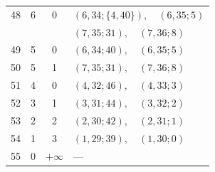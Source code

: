 \documentclass[12pt]{amsart}
\theoremstyle{definition}
\numberwithin{equation}{section}
\begin{document}
\begin{table}[!htbp]
\begin{minipage}{\textwidth}
{\begin{minipage}[t]{0.49\textwidth}
\begin{tabular}{@{}rrcl@{}}
48 & 6 & 0 & $(6,34;\{4,40\}),\quad (6,35;5)$\\
 & &  & $(7,35;31),\quad (7,36;8)$\\
49 & 5 & 0 & $(6,34;40),\quad (6,35;5)$\\
50 & 5 & 1 & $(7,35;31),\quad (7,36;8)$\\
51 & 4 & 0 & $(4,32;46),\quad (4,33;3)$\\
52 & 3 & 1 & $(3,31;44),\quad (3,32;2)$\\
53 & 2 & 2 & $(2,30;42),\quad (2,31;1)$\\
54 & 1 & 3 & $(1,29;39),\quad (1,30;0)$\\
55 & 0 & $+\infty$ & ---\\
\hline
\end{tabular}
\end{minipage}
\par}
\end{minipage}
\end{table}
\end{document}

